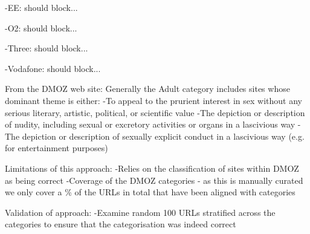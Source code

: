 \documentclass{bmcart}
\begin{document}
-EE: should block...

-O2: should block...

-Three: should block...

-Vodafone: should block...



From the DMOZ web site: 
Generally the Adult category includes sites whose dominant theme is either:
-To appeal to the prurient interest in sex without any serious literary, artistic, political, or scientific value
-The depiction or description of nudity, including sexual or excretory activities or organs in a lascivious way
-The depiction or description of sexually explicit conduct in a lascivious way (e.g. for entertainment purposes)

Limitations of this approach:
-Relies on the classification of sites within DMOZ as being correct
-Coverage of the DMOZ categories - as this is manually curated we only cover a \% of the URLs in total that have been aligned with categories

Validation of approach:
-Examine random 100 URLs stratified across the categories to ensure that the categorisation was indeed correct
\end{document}
